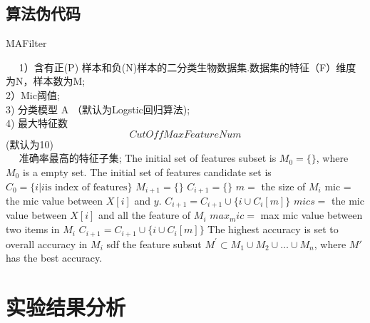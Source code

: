 \documentclass{njubachelor}
\begin{document}
\subsection{算法伪代码}
\newpage
\begin{algorithm}
    \caption{MAFilter}
    \begin{algorithmic}[1]
        \REQUIRE ~~
        1）含有正(P) 样本和负(N)样本的二分类生物数据集.数据集的特征（F）维度为N，样本数为M;\\
        2）Mic阈值;\\
        3) 分类模型 A （默认为Logstic回归算法);\\
        4) 最大特征数 $$CutOffMaxFeatureNum$$ (默认为10)\\
        \ENSURE ~~
        准确率最高的特征子集;
        \STATE The initial set of features subset is $M_0 =\{\}$, where $M_0$ is a empty set.
        \STATE The initial set of features candidate  set is $C_0 =\{i | i \text{is index of features}\}$
            \STATE $M_{i+1}=\{\}$
            \STATE $C_{i+1}=\{\}$
            \STATE $m = $ the size of $M_i$
                    \STATE mic = the mic value between $X[i]$ and $y$.
                        \STATE $C_{i+1} = C_{i+1} \cup \{i \cup C_i[m]\} $
                    \ENDIF
                \ELSE
                    \STATE $mics = $ the mic value between $X[i]$ and all the feature of $M_i$
                    \STATE $max_mic = $ max mic value between two items in $M_i$
                        \STATE $C_{i+1} = C_{i+1} \cup \{i \cup C_{i}[m]\}$
                    \ENDIF    
                \ENDIF
            \ENDFOR
            \STATE The highest accuracy is set to overall accuracy in $M_i$
                \STATE sdf   
            \ENDFOR
        \ENDFOR
        \RETURN the feature subsut $M^{'}\subset M_1 \cup M_2 \cup \dots \cup M_n$, where $M'$ has the best accuracy.
    \end{algorithmic} 

\end{algorithm}
\newpage


\section{实验结果分析}
\end{document}
